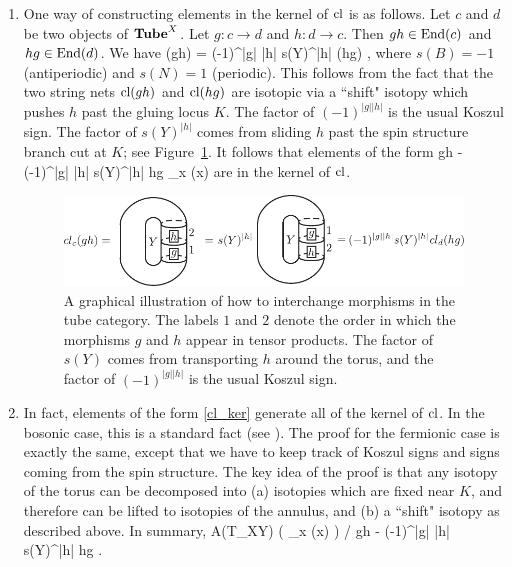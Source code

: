 \begin{enumerate}
\item One way of constructing elements in the kernel of $\text{cl}$ is as follows.
Let $c$ and $d$ be two objects of $\textbf{Tube}^X$.
Let $g: c\to d$ and $h: d\to c$.
Then $gh \in \text{End}(c)$ and $hg \in \text{End}(d)$.
We have
\be
	\cl(gh) = (-1)^{|g| |h|} s(Y)^{|h|} \cl(hg) ,
\ee
where $s(B) = -1$ (antiperiodic) and $s(N) = 1$ (periodic).
This follows from the fact that the two string nets $\text{cl}(gh)$ and $\text{cl}(hg)$ are isotopic
via a ``shift" isotopy which pushes $h$ past the gluing locus $K$.
The factor of $(-1)^{|g| |h|}$ is the usual Koszul sign.
The factor of $s(Y)^{|h|}$ comes from sliding $h$ past the spin structure branch cut at $K$; see Figure~\ref{KernalCl}.
It follows that elements of the form
\be \label{cl_ker}
	gh - (-1)^{|g| |h|} s(Y)^{|h|} hg \in \bigoplus_x \End(x)
\ee
are in the kernel of $\text{cl}$.
\begin{figure}
\begin{center}
\includegraphics{KernalCl.pdf}
\caption{ A graphical illustration of how to interchange morphisms in the tube category. 
The labels $1$ and $2$ denote the order in which the morphisms $g$ and $h$ appear in 
tensor products. The factor of $s(Y)$ comes from transporting $h$ around the torus, and the factor of 
$(-1)^{|g||h|}$ 
is the usual Koszul sign.
}
\label{KernalCl} 
\end{center}
\end{figure}

\item In fact, elements of the form \eqref{cl_ker} generate all of the kernel of $\text{cl}$.
In the bosonic case, this is a standard fact (see \cite{Walker2006}).
The proof for the fermionic case is exactly the same, except that we have to keep track of
Koszul signs and signs coming from the spin structure.
The key idea of the proof is that any isotopy of the torus can be decomposed into (a) isotopies which
are fixed near $K$, and therefore can be lifted to isotopies of the annulus, and (b) a ``shift" isotopy
as described above.
In summary,
\be \label{torus_thm}
	A(T_{XY}) \cong \left( \bigoplus_x \End(x) \right) / \left\langle gh - (-1)^{|g| |h|} s(Y)^{|h|} hg \right\rangle .
\ee


\end{enumerate}
